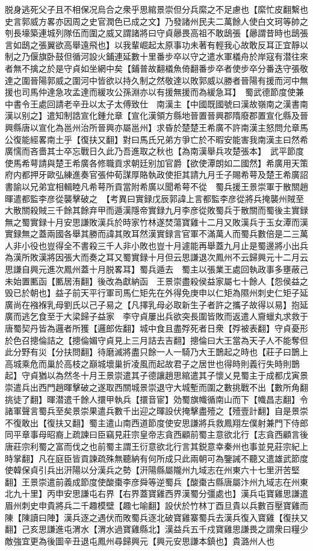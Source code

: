 脱身逃死父子且不相保况烏合之衆乎思綰景崇但分兵縻之不足慮也【縻忙皮翻繫也史言郭威方畧亦因周之史官潤色已成之文】乃發諸州民夫二萬餘人使白文珂等帥之刳長壕築連城列隊伍而圍之威又謂諸將曰守貞曏畏高祖不敢鴟張【曏謂昔時也鴟張言如鴟之張翼欲高舉遠飛也】以我輩崛起太原事功未著有輕我心故敢反耳正宜靜以制之乃偃旗卧鼓但循河設火鋪連延數十里番步卒以守之遣水軍檥舟於岸寇有潜往來者無不擒之於是守貞如坐網中矣【鋪普故翻檥魚倚翻番步卒者使步卒分番迭守張敬達之圍晉陽郭威之圍河中皆欲以持久制之然敬達以敗郭威以勝者晉陽有援而河中無援也司馬仲達急攻孟達而緩攻公孫淵亦以有援無援而為緩急耳】　蜀武德節度使兼中書令王處回請老辛丑以太子太傅致仕　南漢主【中國既國號曰漢故嶺南之漢書南漢以别之】遣知制誥宣化鍾允章【宣化漢領方縣地晉置晉興郡隋廢郡置宣化縣及晉興縣唐以宣化為邕州治所晉興亦屬邕州】求昏於楚楚王希廣不許南漢主怒問允章馬公復能經畧南土乎【復扶又翻】對曰馬氏兄弟方爭亡於不暇安能害我南漢主曰然希廣懦而吝嗇其士卒忘戰日久此乃吾進取之秋也【為南漢舉兵攻楚張本】　武平節度使馬希萼請與楚王希廣各修職貢求朝廷别加官爵【欲使潭朗如二國然】希廣用天策府内都押牙歐弘練進奏官張仲荀謀厚賂執政使拒其請九月壬子賜希萼及楚王希廣詔書諭以兄弟宜相輯睦凡希萼所貢當附希廣以聞希萼不從　蜀兵援王景崇軍于散關趙暉遣都監李彦從襲擊破之　【考異曰實録戊辰郭諱上言都監李彦從將兵掩襲州賊至大散關殺賊三千餘其餘弃甲而遁漢隱帝實録九月李彦從敗蜀兵于散關而蜀後主實録無之蜀實録十月安思謙敗漢兵於時家竹林遂焚蕩寶雞十二月又敗漢兵于玉女潭而漢實録無之蓋兩國各舉其勝而諱其敗耳然漢實録言官軍不滿萬人而蜀兵數倍是二三萬人非小役也豈得全不書殺三千人非小敗也豈十月遽能再舉蓋九月止是蜀邊將小出兵為漢所敗漢將因張大而奏之耳又蜀實録十月但云思謙退次鳳州不云歸興元十二月云思謙自興元進次鳳州蓋十月脱畧耳】蜀兵遁去　蜀主以張業王處回執政事多壅蔽己未始置匭函【匭居洧翻】後改為獻納函　王景崇盡殺侯益家屬七十餘人【怨侯益之毁已於朝也】益子前天平行軍司馬仁矩先在外得免庚申以仁矩為隰州刺史仁矩子延廣尚在襁褓乳母劉氏以己子易之【凡擇乳母必取新生子者許之攜子故得以易】抱延廣而逃乞食至于大梁歸子益家　李守貞屢出兵欲突長圍皆敗而返遣人齎蠟丸求救于唐蜀契丹皆為邏者所獲【邏郎佐翻】城中食且盡殍死者日衆【殍被表翻】守貞憂形於色召摠倫詰之【摠倫媚守貞見上三月詰去吉翻】摠倫曰大王當為天子人不能奪但此分野有災【分扶問翻】待磨滅將盡只餘一人一騎乃大王鵲起之時也【莊子曰鵲上高城乘危而巢於高枝之巔城壞巢折凌風而起故君子之居世也得時則義行失時則鵲起】守貞猶以為然冬十月王景崇遣其子德讓趙思綰遣其子懷乂見蜀主于成都戊寅景崇遣兵出西門趙暉擊破之遂取西關城景崇退守大城塹而圍之數挑戰不出【數所角翻挑徒了翻】暉潜遣千餘人擐甲執兵【擐音宦】効蜀旗幟循南山而下【幟昌志翻】令諸軍聲言蜀兵至矣景崇果遣兵數千出迎之暉設伏掩擊盡殪之【殪壹計翻】自是景崇不復敢出【復扶又翻】蜀主遣山南西道節度使安思謙將兵救鳳翔左僕射兼門下侍郎同平章事母昭裔上疏諫曰臣竊見莊宗皇帝志貪西顧前蜀主意欲北行【志貪西顧言後唐莊宗利蜀之富而伐之也前蜀主謂王衍意欲北行言其鋭意幸秦州也事並見莊宗紀上時掌翻】凡在庭臣皆貢諫疏殊無聽納有何所成只此兩朝可為鑒誡不聽又遣雄武節度使韓保貞引兵出汧陽以分漢兵之勢【汧陽縣屬隴州九域志在州東六十七里汧苦堅翻】王景崇遣前義成節度使酸棗李彦舜等逆蜀兵【酸棗古縣唐屬汴州九域志在州東北九十里】丙申安思謙屯右界【右界蓋寶雞西界漢蜀分彊處也】漢兵屯寶雞思謙遣眉州刺史申貴將兵二千趣模壁【趣七喻翻】設伏於竹林丁酉旦貴以兵數百壓寶雞而陳【陳讀曰陣】漢兵逐之遇伏而敗蜀兵逐北破寶雞寨蜀兵去漢兵復入寶雞【復扶又翻】己亥思謙進屯渭水【渭水過寶雞縣北】漢益兵五千戍寶雞思謙畏之謂衆曰糧少敵強宜更為後圖辛丑退屯鳳州尋歸興元【興元安思謙本鎮也】貴潞州人也